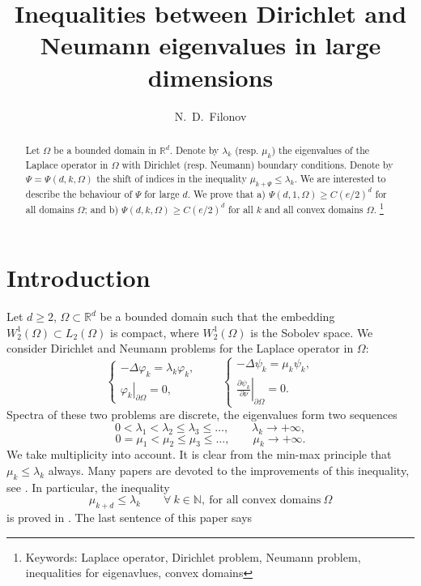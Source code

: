\documentclass[a4paper,12pt]{article}
\title{Inequalities between Dirichlet and Neumann eigenvalues in large dimensions}
\author{N.~D.~Filonov}
\date{}
\numberwithin{equation}{section}
\def \la{\lambda}
\def \ph{\varphi}
\def \D{\Delta}
\def \O{\Omega}
\def \N{\mathbb{N}}
\def \R{\mathbb{R}}
\def\dd{\partial}
\newcommand{\<}{\langle}
\renewcommand{\>}{\rangle}
\theoremstyle{plain}
\theoremstyle{definition}
\theoremstyle{remark}
\renewcommand{\le}{\leqslant}
\renewcommand{\ge}{\geqslant}
\begin{document}
\maketitle

\begin{abstract}
Let $\O$ be a bounded domain in $\R^d$.
Denote by $\la_k$ (resp. $\mu_k$)
the eigenvalues of the Laplace operator in $\O$ with Dirichlet (resp. Neumann)
boundary conditions. 
Denote by $\Psi = \Psi (d,k,\O)$ the shift of indices in the inequality 
$\mu_{k+\Psi} \le \la_k$.
We are interested to describe the behaviour of $\Psi$ for large $d$.
We prove that
a) $\Psi (d,1,\O) \ge C (e/2)^d$ for all domains $\O$; and
b) $\Psi (d,k,\O) \ge C (e/2)^d$ for all $k$ and all convex domains $\O$.
\footnote{Keywords: 
Laplace operator, Dirichlet problem, Neumann problem,
inequalities for eigenavlues, convex domains}
\end{abstract}

\section{Introduction}
Let $d \ge 2$, $\O \subset \R^d$ be a bounded domain 
such that the embedding $W_2^1 (\O) \subset L_2 (\O)$ is compact,
where $W_2^1 (\O)$ is the Sobolev space.
We consider Dirichlet and Neumann problems for the Laplace operator in $\O$:
$$
\begin{cases}
- \D \ph_k = \la_k \ph_k, \\
\left.\ph_k\right|_{\dd\O} = 0,
\end{cases}
\qquad
\begin{cases}
- \D \psi_k = \mu_k \psi_k, \\
\left.\frac{\dd\psi_k}{\dd\nu}\right|_{\dd\O} = 0.
\end{cases}
$$
Spectra of these two problems are discrete,
the eigenvalues form two sequences
\begin{equation*}
0 < \la_1 < \la_2 \le \la_3 \le \dots, \qquad \la_k \to + \infty, 
\end{equation*}
\begin{equation*}
0 = \mu_1 < \mu_2 \le \mu_3 \le \dots, \qquad \mu_k \to + \infty.
\end{equation*}
We take multiplicity into account.
It is clear from the min-max principle that $\mu_k \le \la_k$ always.
Many papers are devoted to the improvements of this inequality,
see \cite{P52, Payne55, Av86, LW86, Fr91, F04, R25}.
In particular, the inequality
\begin{equation}
\label{11}
\mu_{k+d} \le \la_k \qquad \forall \ k \in \N, \ 
\text{for all convex domains} \ \O
\end{equation}
is proved in \cite{LW86}.
The last sentence of this paper says
\end{document}
